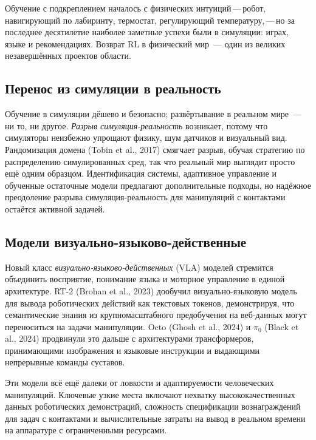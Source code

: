 Обучение с подкреплением началось с физических интуиций\,---\,робот,
навигирующий по лабиринту, термостат, регулирующий температуру,\,---\,но за
последнее десятилетие наиболее заметные успехи были в симуляции:
играх, языке и рекомендациях. Возврат RL в физический
мир~--- один из великих незавершённых проектов области.

\subsection{Перенос из симуляции в реальность}

Обучение в симуляции дёшево и безопасно; развёртывание в реальном мире~---
ни то, ни другое. \emph{Разрыв симуляция-реальность}
возникает, потому что симуляторы неизбежно упрощают физику, шум датчиков
и визуальный вид. Рандомизация домена (Tobin et al., 2017)
смягчает разрыв, обучая стратегию по распределению симулированных сред, так
что реальный мир выглядит просто ещё одним образцом. Идентификация системы,
адаптивное управление и обученные остаточные модели предлагают дополнительные подходы,
но надёжное преодоление разрыва симуляция-реальность для
манипуляций с контактами остаётся активной задачей.

\subsection{Модели визуально-языково-действенные}

Новый класс \emph{визуально-языково-действенных} (VLA) моделей стремится
объединить восприятие, понимание языка и моторное управление в единой
архитектуре. RT-2 (Brohan et al., 2023) дообучил
визуально-языковую модель для вывода роботических действий как текстовых токенов,
демонстрируя, что семантические знания из крупномасштабного предобучения на
веб-данных могут переноситься на задачи манипуляции. Octo (Ghosh et al., 2024) и
$\pi_0$ (Black et al., 2024) продвинули это дальше с
архитектурами трансформеров, принимающими изображения и языковые инструкции
и выдающими непрерывные команды суставов.

Эти модели всё ещё далеки от ловкости и адаптируемости
человеческих манипуляций. Ключевые узкие места включают нехватку
высококачественных данных роботических демонстраций, сложность спецификации
вознаграждений для задач с контактами и вычислительные затраты
на вывод в реальном времени на аппаратуре с ограниченными ресурсами.

